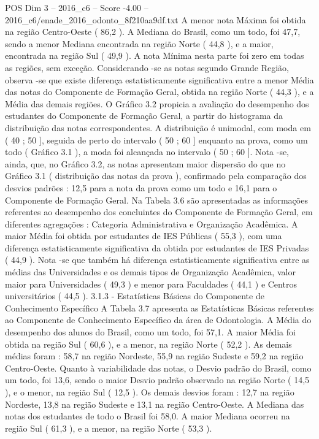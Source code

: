 \begin{textsample}{POS Dim 3 – 2016\_c6 – Score -4.00 – 2016\_c6/enade\_2016\_odonto\_8f210aa9df.txt}
A menor nota Máxima foi obtida na região Centro-Oeste ( 86,2 ).
A Mediana do Brasil, como um todo, foi 47,7, sendo a menor Mediana encontrada na região Norte ( 44,8 ), e a maior, encontrada na região Sul ( 49,9 ).
A nota Mínima nesta parte foi zero em todas as regiões, sem exceção.
Considerando -se as notas segundo Grande Região, observa -se que existe diferença estatisticamente significativa entre a menor Média das notas do Componente de Formação Geral, obtida na região Norte ( 44,3 ), e a Média das demais regiões.
O Gráfico 3.2 propicia a avaliação do desempenho dos estudantes do Componente de Formação Geral, a partir do histograma da distribuição das notas correspondentes.
A distribuição é unimodal, com moda em ( 40 ; 50 ], seguida de perto do intervalo ( 50 ; 60 ] enquanto na prova, como um todo ( Gráfico 3.1 ), a moda foi alcançada no intervalo ( 50 ; 60 ].
Nota -se, ainda, que, no Gráfico 3.2, as notas apresentam maior dispersão do que no Gráfico 3.1 ( distribuição das notas da prova ), confirmado pela comparação dos desvios padrões : 12,5 para a nota da prova como um todo e 16,1 para o Componente de Formação Geral.
Na Tabela 3.6 são apresentadas as informações referentes ao desempenho dos concluintes do Componente de Formação Geral, em diferentes agregações : Categoria Administrativa e Organização Acadêmica.
A maior Média foi obtida por estudantes de IES Públicas ( 55,3 ), com uma diferença estatisticamente significativa da obtida por estudantes de IES Privadas ( 44,9 ).
Nota -se que também há diferença estatisticamente significativa entre as médias das Universidades e os demais tipos de Organização Acadêmica, valor maior para Universidades ( 49,3 ) e menor para Faculdades ( 44,1 ) e Centros universitários ( 44,5 ). 3.1.3 - Estatísticas Básicas do Componente de Conhecimento Específico A Tabela 3.7 apresenta as Estatísticas Básicas referentes ao Componente de Conhecimento Específico da área de Odontologia.
A Média do desempenho dos alunos do Brasil, como um todo, foi 57,1.
A maior Média foi obtida na região Sul ( 60,6 ), e a menor, na região Norte ( 52,2 ).
As demais médias foram : 58,7 na região Nordeste, 55,9 na região Sudeste e 59,2 na região Centro-Oeste.
Quanto à variabilidade das notas, o Desvio padrão do Brasil, como um todo, foi 13,6, sendo o maior Desvio padrão observado na região Norte ( 14,5 ), e o menor, na região Sul ( 12,5 ).
Os demais desvios foram : 12,7 na região Nordeste, 13,8 na região Sudeste e 13,1 na região Centro-Oeste.
A Mediana das notas dos estudantes de todo o Brasil foi 58,0.
A maior Mediana ocorreu na região Sul ( 61,3 ), e a menor, na região Norte ( 53,3 ).

\end{textsample}
